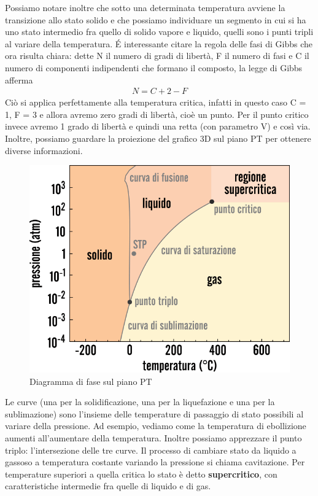 \documentclass[10pt,a4paper]{article}
\begin{document}
\FloatBarrier
Possiamo notare inoltre che sotto una determinata temperatura avviene la transizione allo stato solido e che possiamo individuare un segmento in cui si ha uno stato intermedio fra quello di solido vapore e liquido, quelli sono i punti tripli al variare della temperatura. \'{E} interessante citare la regola delle fasi di Gibbs che ora risulta chiara: dette N il numero di gradi di libertà, F il numero di fasi e C il numero di componenti indipendenti che formano il composto, la legge di Gibbs afferma
\begin{align*}
	N = C + 2 - F
\end{align*} 
Ciò si applica perfettamente alla temperatura critica, infatti in questo caso C = 1, F = 3 e allora avremo zero gradi di libertà, cioè un punto. Per il punto critico invece avremo 1 grado di libertà e quindi una retta (con parametro V) e così via.\\
Inoltre, possiamo guardare la proiezione del grafico 3D sul piano PT per ottenere diverse informazioni. 
\begin{figure}[h!]
	\centering
	\includegraphics[width=0.6\linewidth]{../images/diagrammadifasePT}
	\caption{Diagramma di fase sul piano PT}
	\label{fig:diagrammadifasept}
\end{figure}
\FloatBarrier
Le curve (una per la solidificazione, una per la liquefazione e una per la sublimazione) sono l'insieme delle temperature di passaggio di stato possibili al variare della pressione. Ad esempio, vediamo come la temperatura di ebollizione aumenti all'aumentare della temperatura. Inoltre possiamo apprezzare il punto triplo: l'intersezione delle tre curve. Il processo di cambiare stato da liquido a gassoso a temperatura costante variando la pressione si chiama cavitazione. Per temperature superiori a quella critica lo stato è detto \textbf{supercritico}, con caratteristiche intermedie fra quelle di liquido e di gas. 
\end{document}
